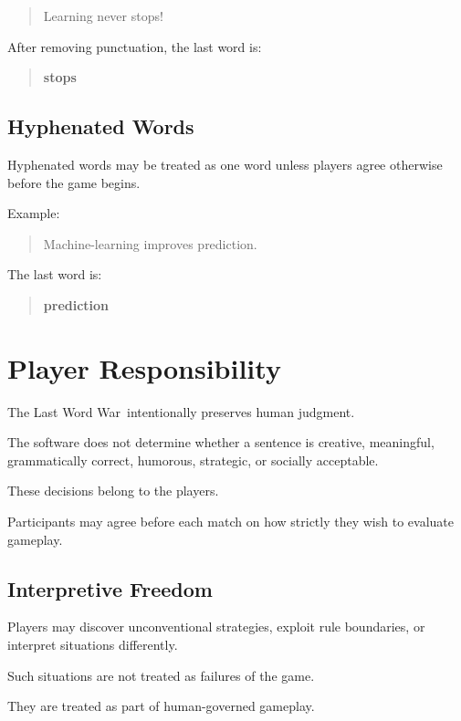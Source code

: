 \documentclass[11pt,a4paper]{article}
\begin{document}
\begin{quote}
Learning never stops!
\end{quote}

After removing punctuation, the last word is:

\begin{quote}
\textbf{stops}
\end{quote}

\subsection{Hyphenated Words}

Hyphenated words may be treated as one word unless players agree otherwise before the game begins.

Example:

\begin{quote}
Machine-learning improves prediction.
\end{quote}

The last word is:

\begin{quote}
\textbf{prediction}
\end{quote}

\section{Player Responsibility}

The Last Word War\texttrademark\ intentionally preserves human judgment.

The software does not determine whether a sentence is creative, meaningful, grammatically correct, humorous, strategic, or socially acceptable.

These decisions belong to the players.

Participants may agree before each match on how strictly they wish to evaluate gameplay.

\subsection{Interpretive Freedom}

Players may discover unconventional strategies, exploit rule boundaries, or interpret situations differently.

Such situations are not treated as failures of the game.

They are treated as part of human-governed gameplay.
\end{document}
